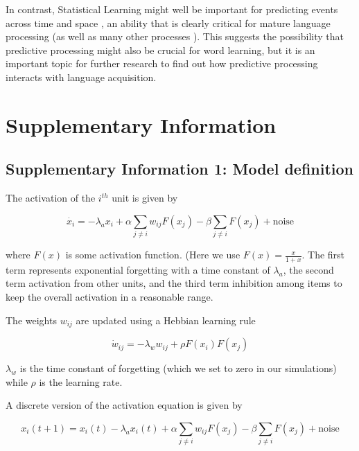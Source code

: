 \documentclass[
]{article}
\begin{document}
In contrast, Statistical Learning might well be important for predicting
events across time
\citep{Endress-stat-recall, Morgan2019, Sherman2020, Turk-Browne2010, Verosky2021}
and space \citep{Theeuwes2022}, an ability that is clearly critical for
mature language processing \citep{Levy2008, Trueswell1999} (as well as
many other processes \citep{Clark2013, Friston2010, Keller2018}). This
suggests the possibility that predictive processing might also be
crucial for word learning, but it is an important topic for further
research to find out how predictive processing interacts with language
acquisition.

\clearpage

\hypertarget{supplementary-information}{%
\section{Supplementary Information}\label{supplementary-information}}

\hypertarget{supplementary-information-1-model-definition}{%
\subsection{Supplementary Information 1: Model
definition}\label{supplementary-information-1-model-definition}}

The activation of the \(i^{th}\) unit is given by

\[
\dot{x_i} = -\lambda_a x_i + \alpha \sum_{j \neq i} w_{ij} F(x_j) - \beta \sum_{j \neq i} F(x_j) + \text{noise}
\]

where \(F(x)\) is some activation function. (Here we use
\(F(x) = \frac{x}{1 + x}\). The first term represents exponential
forgetting with a time constant of \(\lambda_a\), the second term
activation from other units, and the third term inhibition among items
to keep the overall activation in a reasonable range.

The weights \(w_{ij}\) are updated using a Hebbian learning rule

\[
\dot{w}_{ij} = - \lambda_w w_{ij} + \rho F(x_i) F(x_j) 
\]

\(\lambda_w\) is the time constant of forgetting (which we set to zero
in our simulations) while \(\rho\) is the learning rate.

A discrete version of the activation equation is given by

\[
x_i (t+1) = x_i (t) - \lambda_a x_i(t) + \alpha \sum_{j \neq i} w_{ij} F(x_j) - \beta \sum_{j \neq i} F(x_j) + \text{noise}
\]
\end{document}
